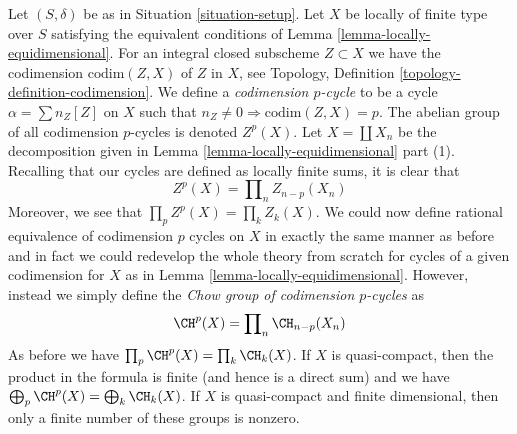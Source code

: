 \noindent
Let $(S, \delta)$ be as in Situation \ref{situation-setup}. Let $X$ be
locally of finite type over $S$ satisfying the equivalent
conditions of Lemma \ref{lemma-locally-equidimensional}. For an integral
closed subscheme $Z \subset X$ we have the codimension $\text{codim}(Z, X)$
of $Z$ in $X$, see Topology, Definition \ref{topology-definition-codimension}.
We define a {\it codimension $p$-cycle} to be a cycle $\alpha = \sum n_Z[Z]$
on $X$ such that $n_Z \not = 0 \Rightarrow \text{codim}(Z, X) = p$.
The abelian group of all codimension $p$-cycles is denoted $Z^p(X)$.
Let $X = \coprod X_n$ be the decomposition given in
Lemma \ref{lemma-locally-equidimensional} part (1).
Recalling that our cycles are defined as locally finite sums, it is clear that
$$
Z^p(X) = \prod\nolimits_n Z_{n - p}(X_n)
$$
Moreover, we see that $\prod_p Z^p(X) = \prod_k Z_k(X)$. We could now define
rational equivalence of codimension $p$ cycles on $X$ in exactly the same
manner as before and in fact we could redevelop the whole theory from scratch
for cycles of a given codimension for $X$ as in
Lemma \ref{lemma-locally-equidimensional}. However, instead we simply
define the {\it Chow group of codimension $p$-cycles} as
$$
\CH^p(X) = \prod\nolimits_n \CH_{n - p}(X_n)
$$
As before we have $\prod_p \CH^p(X) = \prod_k \CH_k(X)$.
If $X$ is quasi-compact, then the product in the formula is finite
(and hence is a direct sum) and we have
$\bigoplus_p \CH^p(X) = \bigoplus_k \CH_k(X)$. If $X$ is quasi-compact
and finite dimensional, then only a finite number of these groups
is nonzero.

